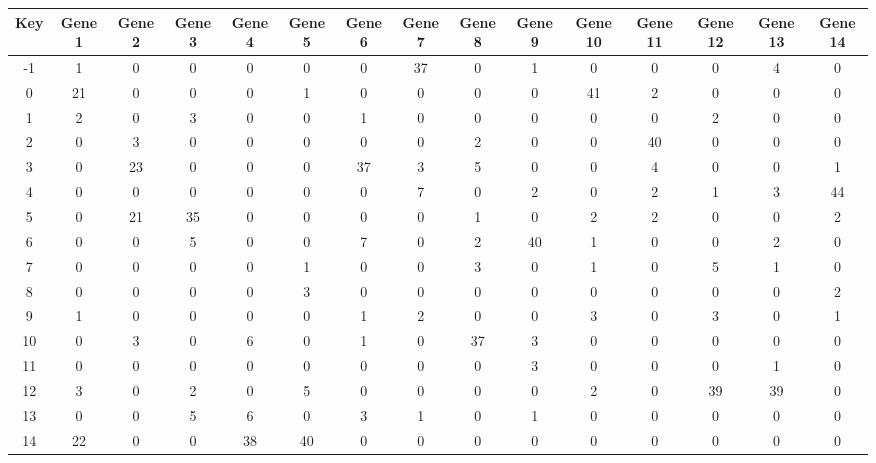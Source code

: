 \begin{tabular}{|c|c|c|c|c|c|c|c|c|c|c|c|c|c|c|}
\hline
Key & Gene 1 & Gene 2 & Gene 3 & Gene 4 & Gene 5 & Gene 6 & Gene 7 & Gene 8 & Gene 9 & Gene 10 & Gene 11 & Gene 12 & Gene 13 & Gene 14 \\
\hline
-1 & 1 & 0 & 0 & 0 & 0 & 0 & 37 & 0 & 1 & 0 & 0 & 0 & 4 & 0 \\
0 & 21 & 0 & 0 & 0 & 1 & 0 & 0 & 0 & 0 & 41 & 2 & 0 & 0 & 0 \\
1 & 2 & 0 & 3 & 0 & 0 & 1 & 0 & 0 & 0 & 0 & 0 & 2 & 0 & 0 \\
2 & 0 & 3 & 0 & 0 & 0 & 0 & 0 & 2 & 0 & 0 & 40 & 0 & 0 & 0 \\
3 & 0 & 23 & 0 & 0 & 0 & 37 & 3 & 5 & 0 & 0 & 4 & 0 & 0 & 1 \\
4 & 0 & 0 & 0 & 0 & 0 & 0 & 7 & 0 & 2 & 0 & 2 & 1 & 3 & 44 \\
5 & 0 & 21 & 35 & 0 & 0 & 0 & 0 & 1 & 0 & 2 & 2 & 0 & 0 & 2 \\
6 & 0 & 0 & 5 & 0 & 0 & 7 & 0 & 2 & 40 & 1 & 0 & 0 & 2 & 0 \\
7 & 0 & 0 & 0 & 0 & 1 & 0 & 0 & 3 & 0 & 1 & 0 & 5 & 1 & 0 \\
8 & 0 & 0 & 0 & 0 & 3 & 0 & 0 & 0 & 0 & 0 & 0 & 0 & 0 & 2 \\
9 & 1 & 0 & 0 & 0 & 0 & 1 & 2 & 0 & 0 & 3 & 0 & 3 & 0 & 1 \\
10 & 0 & 3 & 0 & 6 & 0 & 1 & 0 & 37 & 3 & 0 & 0 & 0 & 0 & 0 \\
11 & 0 & 0 & 0 & 0 & 0 & 0 & 0 & 0 & 3 & 0 & 0 & 0 & 1 & 0 \\
12 & 3 & 0 & 2 & 0 & 5 & 0 & 0 & 0 & 0 & 2 & 0 & 39 & 39 & 0 \\
13 & 0 & 0 & 5 & 6 & 0 & 3 & 1 & 0 & 1 & 0 & 0 & 0 & 0 & 0 \\
14 & 22 & 0 & 0 & 38 & 40 & 0 & 0 & 0 & 0 & 0 & 0 & 0 & 0 & 0 \\
\hline
\end{tabular}